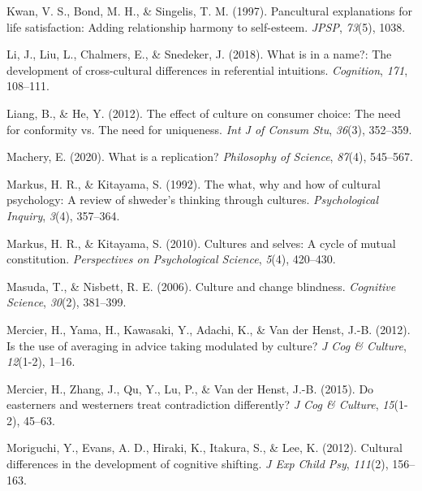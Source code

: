 \documentclass[
  man]{apa6}
\newlength{\cslhangindent}
\newlength{\cslentryspacingunit} %
\newenvironment{CSLReferences}[2] %
 {%
  \setlength{\parindent}{0pt}
  \ifodd #1
  \let\oldpar\par
  \def\par{\hangindent=\cslhangindent\oldpar}
  \fi
  \setlength{\parskip}{#2\cslentryspacingunit}
 }%
 {}
\begin{document}
\begin{CSLReferences}{1}{0}
\leavevmode{}%
Kwan, V. S., Bond, M. H., \& Singelis, T. M. (1997). Pancultural explanations for life satisfaction: Adding relationship harmony to self-esteem. \emph{JPSP}, \emph{73}(5), 1038.

\leavevmode{}%
Li, J., Liu, L., Chalmers, E., \& Snedeker, J. (2018). What is in a name?: The development of cross-cultural differences in referential intuitions. \emph{Cognition}, \emph{171}, 108--111.

\leavevmode{}%
Liang, B., \& He, Y. (2012). The effect of culture on consumer choice: The need for conformity vs. The need for uniqueness. \emph{Int J of Consum Stu}, \emph{36}(3), 352--359.

\leavevmode{}%
Machery, E. (2020). What is a replication? \emph{Philosophy of Science}, \emph{87}(4), 545--567.

\leavevmode{}%
Markus, H. R., \& Kitayama, S. (1992). The what, why and how of cultural psychology: A review of shweder's thinking through cultures. \emph{Psychological Inquiry}, \emph{3}(4), 357--364.

\leavevmode{}%
Markus, H. R., \& Kitayama, S. (2010). Cultures and selves: A cycle of mutual constitution. \emph{Perspectives on Psychological Science}, \emph{5}(4), 420--430.

\leavevmode{}%
Masuda, T., \& Nisbett, R. E. (2006). Culture and change blindness. \emph{Cognitive Science}, \emph{30}(2), 381--399.

\leavevmode{}%
Mercier, H., Yama, H., Kawasaki, Y., Adachi, K., \& Van der Henst, J.-B. (2012). Is the use of averaging in advice taking modulated by culture? \emph{J Cog \& Culture}, \emph{12}(1-2), 1--16.

\leavevmode{}%
Mercier, H., Zhang, J., Qu, Y., Lu, P., \& Van der Henst, J.-B. (2015). Do easterners and westerners treat contradiction differently? \emph{J Cog \& Culture}, \emph{15}(1-2), 45--63.

\leavevmode{}%
Moriguchi, Y., Evans, A. D., Hiraki, K., Itakura, S., \& Lee, K. (2012). Cultural differences in the development of cognitive shifting. \emph{J Exp Child Psy}, \emph{111}(2), 156--163.


\end{CSLReferences}
\end{document}
